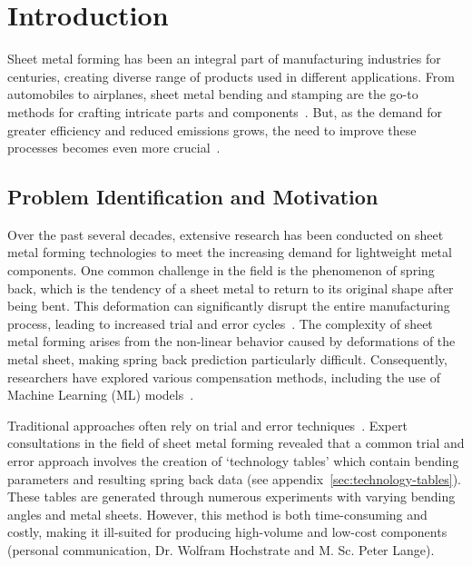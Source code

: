 \chapter{Introduction}\label{ch:introduction}

Sheet metal forming has been an integral part of manufacturing industries for centuries, creating
diverse range of products used in different applications.
From automobiles to airplanes, sheet metal bending and stamping are the go-to methods for
crafting intricate parts and components~\cite[p. 1]{cruz_applicationmachinelearning_2021}.
But, as the demand for greater efficiency and reduced emissions grows, the need to improve these
processes becomes even more crucial~\cite[p. 4]{zheng_reviewformingtechniques_2018}.


\section{Problem Identification and Motivation}\label{sec:problem-identification-and-motivation}
Over the past several decades, extensive research has been conducted on sheet metal forming technologies to meet the
increasing demand for lightweight metal components.
One common challenge in the field is the phenomenon of spring back, which is the tendency of a sheet metal to return
to its original shape after being bent.
This deformation can significantly disrupt the entire manufacturing process, leading to increased trial and error
cycles~\cite[p. 1]{cruz_applicationmachinelearning_2021}.
The complexity of sheet metal forming arises from the non-linear behavior caused by deformations of the metal sheet,
making spring back prediction particularly difficult.
Consequently, researchers have explored various compensation methods, including the use of Machine Learning (ML)
models~\cite[p.1]{liu_newmachinelearning_2012}.

Traditional approaches often rely on trial and error techniques~\cite[p. 1]{dib_singleensembleclassifiers_2020}.
Expert consultations in the field of sheet metal forming revealed that a common trial and error approach involves the
creation of `technology tables' which contain bending parameters and resulting spring back data
(see appendix~\ref{sec:technology-tables}).
These tables are generated through numerous experiments with varying bending angles and metal sheets.
However, this method is both time-consuming and costly, making it ill-suited for producing high-volume and low-cost
components (personal communication, Dr. Wolfram Hochstrate and M. Sc. Peter Lange).

